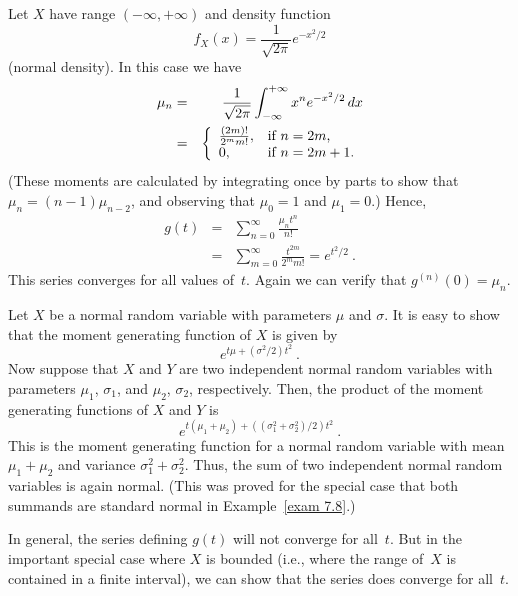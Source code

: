 \begin{example}\label{exam 10.3.3}
Let $X$ have range $(-\infty,+\infty)$ and density function
$$
f_X(x) = \frac1{\sqrt{2\pi}} e^{-x^2/2}
$$
(normal density).  In this case we have
\begin{eqnarray*}
\mu_n &=& \frac1{\sqrt{2\pi}} \int_{-\infty}^{+\infty} x^n e^{-x^2/2}\, dx \\
      &=& \left \{ \begin{array}{ll}
                        \frac{(2m)!}{2^{m} m!}, & \mbox{if $ n = 2m$,}\cr
                        0,                      & \mbox{if $ n = 2m+1$.}\end{array}\right.
\end{eqnarray*}
(These moments are calculated by integrating once by parts to show that $\mu_n
= (n - 1)\mu_{n - 2}$, and observing that $\mu_0 = 1$ and $\mu_1 = 0$.)  Hence,
\begin{eqnarray*}
g(t) &=& \sum_{n = 0}^\infty \frac{\mu_n t^n}{n!} \\
     &=& \sum_{m = 0}^\infty \frac{t^{2m}}{2^{m} m!} = e^{t^2/2}\ .
\end{eqnarray*}
This series converges for all values of~$t$.  Again we can verify that
$g^{(n)}(0) = \mu_n$.
\par
Let $X$ be a normal random variable with parameters $\mu$ and $\sigma$.  It is easy
to show that the moment generating function of $X$ is given by
$$e^{t\mu + (\sigma^2/2)t^2}\ .$$
Now suppose that $X$ and $Y$ are two independent normal random variables with
parameters $\mu_1$, $\sigma_1$, and $\mu_2$, $\sigma_2$, respectively.  Then,
the product of the moment generating functions of $X$ and $Y$ is
$$e^{t(\mu_1 + \mu_2) + ((\sigma_1^2 + \sigma_2^2)/2)t^2}\ .$$
This is the moment generating function for a normal random variable with mean
$\mu_1 + \mu_2$ and variance $\sigma_1^2 + \sigma_2^2$.  Thus, the sum
of two independent normal random variables is again normal.  (This was proved
for the special case that both summands are standard normal in Example~\ref{exam 
7.8}.)
\end{example}

In general, the series defining $g(t)$ will not converge for all~$t$.  But in
the important special case where $X$ is bounded (i.e., where the range of~$X$
is contained in a finite interval), we can show that the series does converge
for all~$t$.

